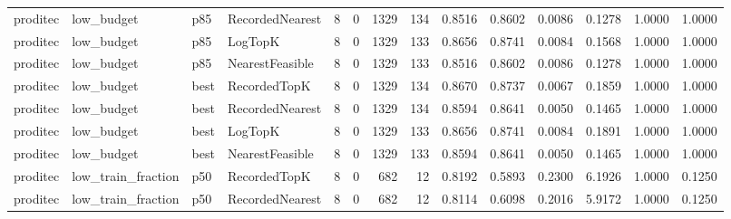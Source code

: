 \begin{tabular}{llllrrrrrrrrrr}
proditec &           low\_budget &    p85 & RecordedNearest &           8 &          0 &           1329 &                 134 &         0.8516 &          0.8602 &                    0.0086 &         0.1278 &                 1.0000 &                  1.0000 \\
proditec &           low\_budget &    p85 &         LogTopK &           8 &          0 &           1329 &                 133 &         0.8656 &          0.8741 &                    0.0084 &         0.1568 &                 1.0000 &                  1.0000 \\
proditec &           low\_budget &    p85 & NearestFeasible &           8 &          0 &           1329 &                 133 &         0.8516 &          0.8602 &                    0.0086 &         0.1278 &                 1.0000 &                  1.0000 \\
proditec &           low\_budget &   best &    RecordedTopK &           8 &          0 &           1329 &                 134 &         0.8670 &          0.8737 &                    0.0067 &         0.1859 &                 1.0000 &                  1.0000 \\
proditec &           low\_budget &   best & RecordedNearest &           8 &          0 &           1329 &                 134 &         0.8594 &          0.8641 &                    0.0050 &         0.1465 &                 1.0000 &                  1.0000 \\
proditec &           low\_budget &   best &         LogTopK &           8 &          0 &           1329 &                 133 &         0.8656 &          0.8741 &                    0.0084 &         0.1891 &                 1.0000 &                  1.0000 \\
proditec &           low\_budget &   best & NearestFeasible &           8 &          0 &           1329 &                 133 &         0.8594 &          0.8641 &                    0.0050 &         0.1465 &                 1.0000 &                  1.0000 \\
proditec &   low\_train\_fraction &    p50 &    RecordedTopK &           8 &          0 &            682 &                  12 &         0.8192 &          0.5893 &                    0.2300 &         6.1926 &                 1.0000 &                  0.1250 \\
proditec &   low\_train\_fraction &    p50 & RecordedNearest &           8 &          0 &            682 &                  12 &         0.8114 &          0.6098 &                    0.2016 &         5.9172 &                 1.0000 &                  0.1250 \\

\end{tabular}
